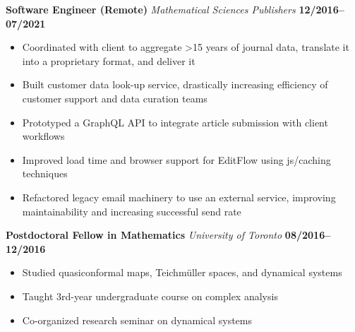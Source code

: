 \documentclass[12pt]{article}
\newcommand\verticalspace{\vspace{0.5cm}}
\begin{document}
\textbf{Software Engineer (Remote)} \emph{Mathematical Sciences Publishers} \hfill \textbf{12/2016--07/2021}
\begin{itemize}
  \item Coordinated with client to aggregate >15 years of journal data, translate it into a proprietary format, and deliver it
  \item Built customer data look-up service, drastically increasing efficiency of customer support and data curation teams
  \item Prototyped a GraphQL API to integrate article submission with client workflows
  \item Improved load time and browser support for EditFlow using js/caching techniques
  \item Refactored legacy email machinery to use an external service, improving maintainability and increasing successful send rate
\end{itemize}

\verticalspace

\textbf{Postdoctoral Fellow in Mathematics} \emph{University of Toronto} \hfill \textbf{08/2016--12/2016}
\begin{itemize}
  \item Studied quasiconformal maps, Teichm\"{u}ller spaces, and dynamical systems
  \item Taught 3rd-year undergraduate course on complex analysis
  \item Co-organized research seminar on dynamical systems
\end{itemize}
\end{document}
